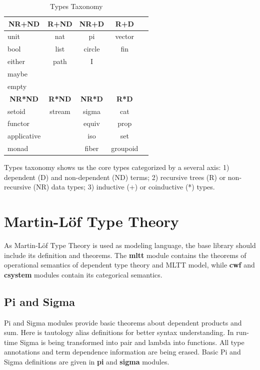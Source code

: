 \documentclass{article}
\newcommand*{\thead}[1]{\multicolumn{1}{c}{\bfseries #1}}
\begin{document}
\begin{table}[h]
\centering
\caption{Types Taxonomy}
\label{tab:a}
\begin{tabular}{lcccc}
\hline
\thead{NR+ND} & \thead{R+ND} & \thead{NR+D} & \thead{R+D}\\
\hline
unit        & nat    & pi      & vector \\
bool        & list   & circle  & fin \\
either      & path   & I       &  \\
maybe       &        &         &  \\
empty       &        &         &  \\
\hline
\thead{NR*ND} & \thead{R*ND} & \thead{NR*D} & \thead{R*D}\\
\hline
setoid      & stream & sigma   & cat  \\
functor     &        & equiv   & prop \\
applicative &        & iso     & set  \\
monad       &        & fiber   & groupoid \\
\end{tabular}
\end{table}

Types taxonomy shows us the core types categorized by a several axis:
1) dependent (D) and non-dependent (ND) terms;
2) recursive trees (R) or non-recursive (NR) data types;
3) inductive (+) or coinductive (*) types.

\section{Martin-Löf Type Theory}

As Martin-Löf Type Theory is used as modeling language,
the base library should include its definition and theorems.
The {\bf mltt} module contains the theorems of operational semantics of
dependent type theory and MLTT model, while {\bf cwf} and {\bf csystem}
modules contain its categorical semantics.

\subsection{Pi and Sigma}

Pi and Sigma modules provide basic theorems about dependent products and sum.
Here is tautology alias definitions for better syntax understanding.
In run-time Sigma is being transformed into pair and lambda into functions.
All type annotations and term dependence information are being erased.
Basic Pi and Sigma definitions are given in {\bf pi} and {\bf sigma} modules.
\end{document}

